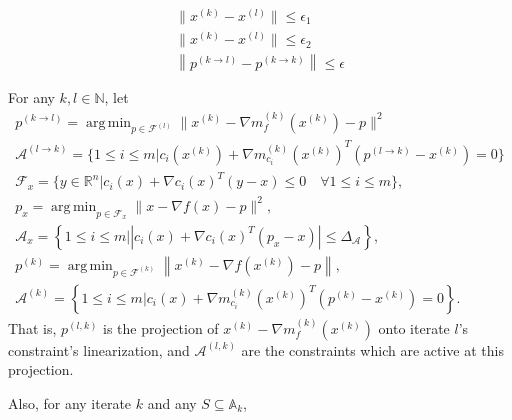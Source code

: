 \documentclass{article}
\theoremstyle{case}
\numberwithin{theorem}{subsection}
\DeclareMathOperator*{\argmin}{arg\,min}
\newcommand{\activeconstraintsk}{{\mathbb A_{k}}}
\newcommand{\feasiblek}{{\mathcal F^{(k)}}}
\newcommand{\gk}{{\nabla m_f^{(k)}(x^{(k)})}}
\newcommand{\gmcik}{{\nabla m_{c_i}^{(k)}\left(\xk\right)}}
\newcommand{\gradf}{\nabla f}
\newcommand{\minactivegraddelta}{{\Delta_{\mathcal A}}}
\newcommand{\naturals}{\mathbb N}
\newcommand{\Rn}{\mathbb R^n}
\newcommand{\xk}{{x^{(k)}}}
\begin{document}
\begin{align*}
\|\xk - x^{(l)}\| \le \epsilon_1 \\
\|\xk - x^{(l)}\| \le \epsilon_2 \\
\left\|p^{(k\to l)} - p^{(k\to k)}\right\| \le \epsilon
\end{align*}






For any $k, l \in \naturals$, let 
\begin{align}
p^{(k \to l)} = \argmin_{p \in \mathcal F^{(l)}} \|\xk - \gk - p\|^2 \label{bp2_define_plk} \\
\mathcal A^{(l \to k)} = \{1 \le i \le m | c_i(\xk) + \gmcik^T(p^{(l\to k)} - \xk) = 0 \} \label{bp_define_activep} \\
\mathcal F_x = \{ y \in \Rn | c_i(x) + \nabla c_i(x)^T(y - x) \le 0 \quad \forall 1 \le i \le m\}, \label{bp_define_true_linearization} \\
p_x = \argmin_{p \in \mathcal F_x} \|x - \gradf(x) - p\|^2, \label{bp_define_true_projection} \\
\mathcal A_x = \left\{1 \le i \le m | \left|c_i(x) + \nabla c_i(x)^T(p_x - x)\right| \le \minactivegraddelta \right\}, \label{define_projection_active} \\
p^{(k)} = \argmin_{p \in \feasiblek} \left\| \xk - \nabla f\left(\xk\right) - p \right\|, \label{bp_define_pl} \\
\mathcal A^{(k)} = \left\{1 \le i \le m | c_i(x) + \gmcik^T\left(p^{(k)} - \xk\right) = 0 \right\}. \label{bp_define_yet_another_thing}
\end{align}
That is, $p^{(l, k)}$ is the projection of $\xk - \gk$ onto iterate $l$'s constraint's linearization,
and $\mathcal A^{(l, k)}$ are the constraints which are active at this projection.

Also, for any iterate $k$ and any $S \subseteq \activeconstraintsk$,
\end{document}
